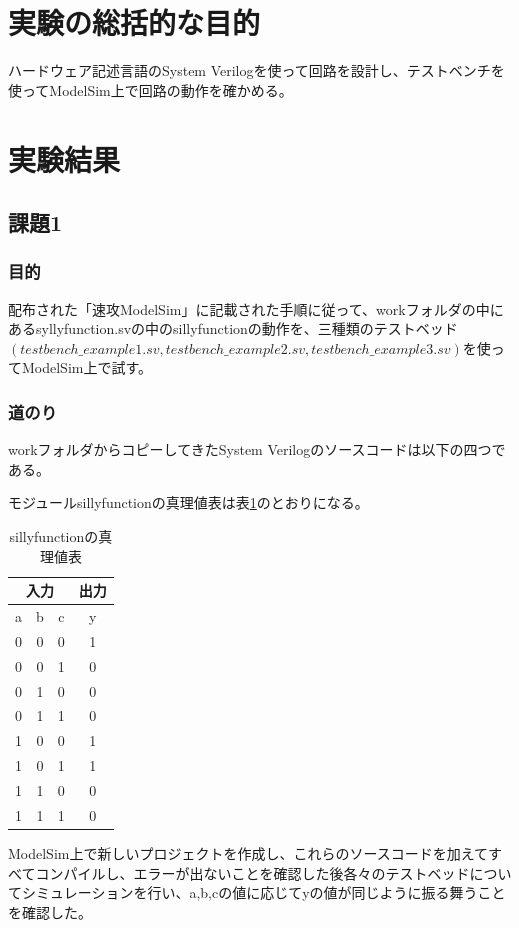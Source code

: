 \documentclass[a4paper]{jarticle}
\begin{document}
\section{実験の総括的な目的}
ハードウェア記述言語のSystem Verilogを使って回路を設計し、テストベンチを使ってModelSim上で回路の動作を確かめる。
\section{実験結果}
\subsection{課題1}
\subsubsection{目的}
配布された「速攻ModelSim」に記載された手順に従って、workフォルダの中にあるsyllyfunction.svの中のsillyfunctionの動作を、三種類のテストベッド$(testbench\_example1.sv,testbench\_example2.sv,testbench\_example3.sv)$を使ってModelSim上で試す。
\subsubsection{道のり}
workフォルダからコピーしてきたSystem Verilogのソースコードは以下の四つである。




モジュールsillyfunctionの真理値表は表\ref{Work1TruthTable}のとおりになる。
\begin{table}[ht]
	\begin{center}
		\caption{sillyfunctionの真理値表}
		\label{Work1TruthTable}
		\begin{tabular}{|c|c|c||c|}
			\hline
			\multicolumn{3}{|c|}{入力} & \multicolumn{1}{|c|}{出力}\\ \hline\hline
			a	&b	&c	&y\\	\hline\hline
			0	&0	&0	&1\\	\hline
			0	&0	&1	&0\\	\hline
			0	&1	&0	&0\\	\hline
			0	&1	&1	&0\\	\hline
			1	&0	&0	&1\\	\hline
			1	&0	&1	&1\\	\hline
			1	&1	&0	&0\\	\hline
			1	&1	&1	&0\\	\hline
		\end{tabular}
	\end{center}
\end{table}
ModelSim上で新しいプロジェクトを作成し、これらのソースコードを加えてすべてコンパイルし、エラーが出ないことを確認した後各々のテストベッドについてシミュレーションを行い、a,b,cの値に応じてyの値が同じように振る舞うことを確認した。
\end{document}

